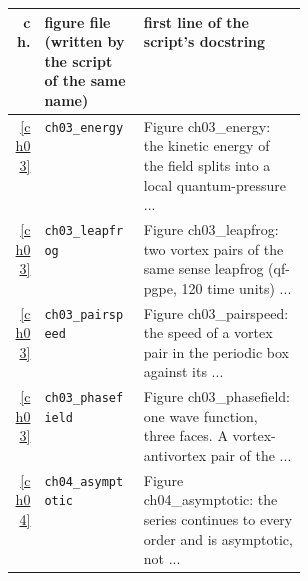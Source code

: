 \begin{center}\footnotesize\setlength{\tabcolsep}{3pt}\begin{tabularx}{\linewidth}{@{}r>{\raggedright}p{0.34\linewidth}>{\raggedright\arraybackslash}X@{}}\toprule ch. & figure file (written by the script of the same name) & first line of the script's docstring\\\midrule
\ref{ch03} & \texttt{ch03\_\allowbreak{}energy} & Figure ch03\_\allowbreak{}energy: the kinetic energy of the field splits into a local quantum-\allowbreak{}pressure .\allowbreak{}.\allowbreak{}.\allowbreak{} \\
\ref{ch03} & \texttt{ch03\_\allowbreak{}leapfrog} & Figure ch03\_\allowbreak{}leapfrog: two vortex pairs of the same sense leapfrog (qf-\allowbreak{}pgpe,\allowbreak{} 120 time units) .\allowbreak{}.\allowbreak{}.\allowbreak{} \\
\ref{ch03} & \texttt{ch03\_\allowbreak{}pairspeed} & Figure ch03\_\allowbreak{}pairspeed: the speed of a vortex pair in the periodic box against its .\allowbreak{}.\allowbreak{}.\allowbreak{} \\
\ref{ch03} & \texttt{ch03\_\allowbreak{}phasefield} & Figure ch03\_\allowbreak{}phasefield: one wave function,\allowbreak{} three faces.\allowbreak{}  A vortex-\allowbreak{}antivortex pair of the .\allowbreak{}.\allowbreak{}.\allowbreak{} \\
\ref{ch04} & \texttt{ch04\_\allowbreak{}asymptotic} & Figure ch04\_\allowbreak{}asymptotic: the series continues to every order and is asymptotic,\allowbreak{} not .\allowbreak{}.\allowbreak{}.\allowbreak{} \\
\bottomrule\end{tabularx}\end{center}
